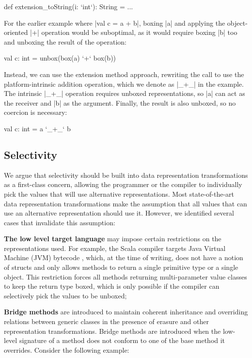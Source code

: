 \begin{lstlisting-nobreak}
 def extension_toString(i: `int`): String = ...
\end{lstlisting-nobreak}

For the earlier example where |val c = a + b|, boxing |a| and applying the object-oriented |+| operation would be suboptimal, as it would require boxing |b| too and unboxing the result of the operation:

\begin{lstlisting-nobreak}
 val c: int = unbox(box(a) `+` box(b))
\end{lstlisting-nobreak}

Instead, we can use the extension method approach, rewriting the call to use the platform-intrinsic  addition operation, which we denote as |_+_| in the example. The intrinsic |_+_| operation requires unboxed representations, so |a| can act as the receiver and |b| as the argument. Finally, the result is also unboxed, so no coercion is necessary:

\begin{lstlisting-nobreak}
 val c: int = a `_+_` b
\end{lstlisting-nobreak}

\subsection{Selectivity}
\label{ldl:sec:problem-oo/selectivity}

We argue that selectivity should be built into data representation transformations as a first-class concern, allowing the programmer or the compiler to individually pick the values that will use alternative representations. Most state-of-the-art data representation transformations make the assumption that all values that can use an alternative representation should use it. However, we identified several cases that invalidate this assumption:

\textbf{The low level target language} may impose certain restrictions on the representations used. For example, the Scala compiler targets Java Virtual Machine (JVM) bytecode \cite{java-spec}, which, at the time of writing, does not have a notion of structs and only allows methods to return a single primitive type or a single object. This restriction forces all methods returning multi-parameter value classes to keep the return type boxed, which is only possible if the compiler can selectively pick the values to be unboxed;

\textbf{Bridge methods} \cite{cartwright-nextgen} are introduced to maintain coherent inheritance and overriding relations between generic classes in the presence of erasure and other representation transformations. Bridge methods are introduced when the low-level signature of a method does not conform to one of the base method it overrides. Consider the following example:

